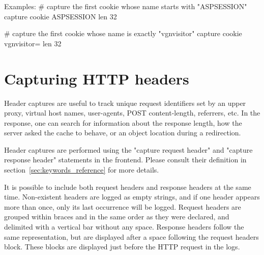   \begin{example}{Examples:}
        # capture the first cookie whose name starts with "ASPSESSION"
        capture cookie ASPSESSION len 32

        # capture the first cookie whose name is exactly "vgnvisitor"
        capture cookie vgnvisitor= len 32
  \end{example}

\section{Capturing HTTP headers}
\label{sec:capturing_http_headers}

Header captures are useful to track unique request identifiers set by an upper
proxy, virtual host names, user-agents, POST content-length, referrers, etc. In
the response, one can search for information about the response length, how the
server asked the cache to behave, or an object location during a redirection.

Header captures are performed using the "capture request header" and "capture
response header" statements in the frontend. Please consult their definition in
section~\ref{sec:keywords_reference} for more details.

It is possible to include both request headers and response headers at the same
time. Non-existent headers are logged as empty strings, and if one header
appears more than once, only its last occurrence will be logged. Request headers
are grouped within braces \chr{\{} and \chr{\}} in the same order as they were declared,
and delimited with a vertical bar \chr{|} without any space. Response headers
follow the same representation, but are displayed after a space following the
request headers block. These blocks are displayed just before the HTTP request
in the logs.

